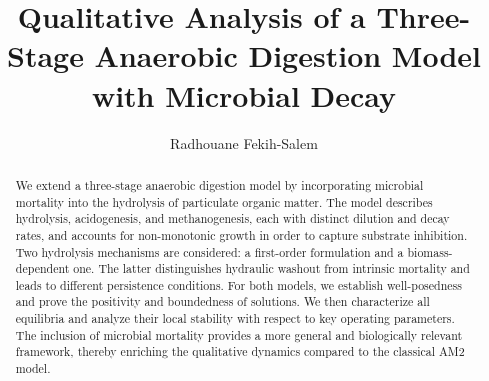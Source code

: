 \documentclass[runningheads]{llncs}
\begin{document}
 
\title{Qualitative Analysis of a Three-Stage Anaerobic Digestion Model with Microbial Decay}
%
\author{Radhouane Fekih-Salem
}
%
%
%
\maketitle              %
%

\begin{abstract}
We extend a three-stage anaerobic digestion model by incorporating microbial mortality into the hydrolysis of particulate organic matter. The model describes hydrolysis, acidogenesis, and methanogenesis, each with distinct dilution and decay rates, and accounts for non-monotonic growth in order to capture substrate inhibition. Two hydrolysis mechanisms are considered: a first-order formulation and a biomass-dependent one. The latter distinguishes hydraulic washout from intrinsic mortality and leads to different persistence conditions. For both models, we establish well-posedness and prove the positivity and boundedness of solutions. We then characterize all equilibria and analyze their local stability with respect to key operating parameters.
The inclusion of microbial mortality provides a more general and biologically relevant framework, thereby enriching the qualitative dynamics compared to the classical AM2 model.

\end{abstract}
\end{document}
